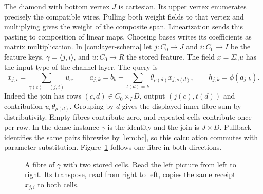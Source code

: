 \documentclass[11pt,a4paper]{article}
\theoremstyle{definition}
\theoremstyle{remark}\newaliascnt{remark}{theorem}
\numberwithin{equation}{section}
\begin{document}
The diamond with bottom vertex \(J\) is cartesian. Its upper vertex enumerates precisely the compatible wires. Pulling both weight fields to that vertex and multiplying gives the weight of the composite span. Linearization sends this pasting to composition of linear maps. Choosing bases writes its coefficients as matrix multiplication.
In \cref{con:layer-schema} let $j:C_0\to J$ and $i:C_0\to I$ be the feature keys, $\gamma=\langle j,i\rangle$, and $u:C_0\to R$ the stored feature. The field $x=\Sigma_\gamma u$ has the input type of the channel layer. The query is
\begin{equation}\label{eq:layer}
 x_{j,i}=\sum_{\gamma(c)=(j,i)}u_c,\qquad
 a_{j,k}=b_k+\sum_{t(d)=k}\theta_{\rho(d)}x_{j,s(d)},\qquad
 h_{j,k}=\phi(a_{j,k}).
\end{equation}
Indeed the join has rows $(c,d)\in C_0\times_I D$, output $(j(c),t(d))$ and contribution $u_c\theta_{\rho(d)}$. Grouping by $d$ gives the displayed inner fibre sum by distributivity. Empty fibres contribute zero, and repeated cells contribute once per row. In the dense instance $\gamma$ is the identity and the join is $J\times D$. Pullback identifies the same pairs fibrewise by \cref{lem:bc}, so this calculation commutes with parameter substitution. Figure~\ref{fig:feature-fibre} follows one fibre in both directions.

\begin{figure}[!htbp]
    \centering\small
    \caption{A fibre of $\gamma$ with two stored cells. Read the left picture from left to right. Its transpose, read from right to left, copies the same receipt $\bar x_{j,i}$ to both cells.}
    \label{fig:feature-fibre}
\end{figure}
\end{document}
